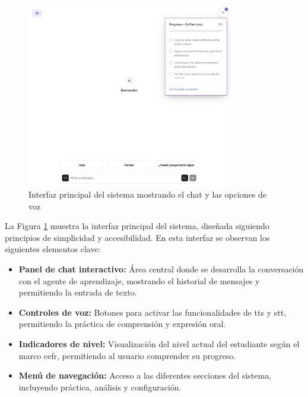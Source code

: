 \begin{figure}[H]
    \centering
    \includegraphics[width=0.8\textwidth]{figuras/screenshots/chat-initial.png}
    \caption{Interfaz principal del sistema mostrando el chat y las opciones de voz}
    \label{fig:main-interface}
\end{figure}


La Figura \ref{fig:main-interface} muestra la interfaz principal del sistema, diseñada siguiendo principios de simplicidad y accesibilidad. En esta interfaz se observan los siguientes elementos clave:

\begin{itemize}
    \item \textbf{Panel de chat interactivo:} Área central donde se desarrolla la conversación con el agente de aprendizaje, mostrando el historial de mensajes y permitiendo la entrada de texto.
    
    \item \textbf{Controles de voz:} Botones para activar las funcionalidades de \gls{tts} y \gls{stt}, permitiendo la práctica de comprensión y expresión oral.
    
    \item \textbf{Indicadores de nivel:} Visualización del nivel actual del estudiante según el marco \gls{cefr}, permitiendo al usuario comprender su progreso.
    
    \item \textbf{Menú de navegación:} Acceso a las diferentes secciones del sistema, incluyendo práctica, análisis y configuración.
\end{itemize}

